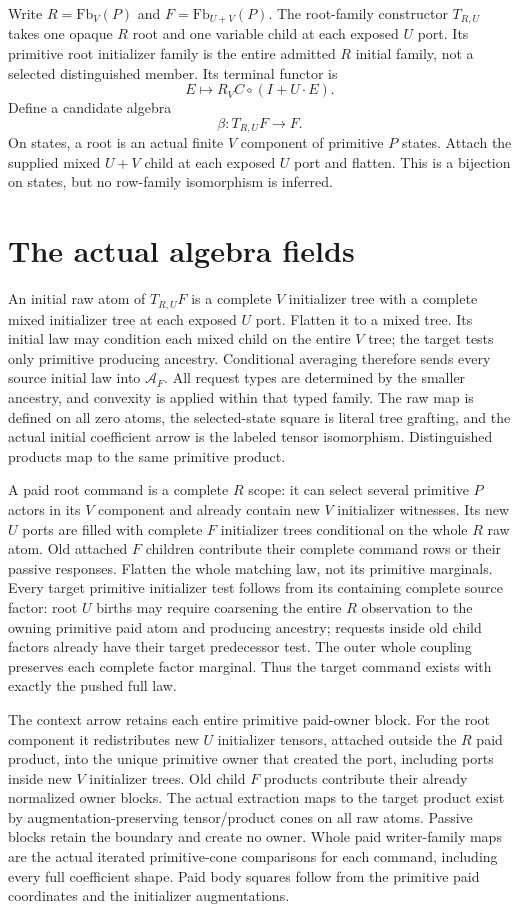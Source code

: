 \documentclass[11pt]{article}\usepackage{amsmath,amssymb,amsthm,geometry}\geometry{margin=1in}\newtheorem{lemma}{Lemma}\newtheorem{theorem}[lemma]{Theorem}
\begin{document}
Write $R=\mathrm{Fb}_V(P)$ and $F=\mathrm{Fb}_{U+V}(P)$. The root-family constructor $T_{R,U}$ takes one opaque $R$ root and one variable child at each exposed $U$ port. Its primitive root initializer family is the entire admitted $R$ initial family, not a selected distinguished member. Its terminal functor is
\[
             E\longmapsto R_VC\circ(I+U\cdot E).
\]
Define a candidate algebra
\[
                        \beta:T_{R,U}F\longrightarrow F.       \tag{1}
\]
On states, a root is an actual finite $V$ component of primitive $P$ states. Attach the supplied mixed $U+V$ child at each exposed $U$ port and flatten. This is a bijection on states, but no row-family isomorphism is inferred.

\section{The actual algebra fields}
An initial raw atom of $T_{R,U}F$ is a complete $V$ initializer tree with a complete mixed initializer tree at each exposed $U$ port. Flatten it to a mixed tree. Its initial law may condition each mixed child on the entire $V$ tree; the target tests only primitive producing ancestry. Conditional averaging therefore sends every source initial law into $\mathcal A_F$. All request types are determined by the smaller ancestry, and convexity is applied within that typed family. The raw map is defined on all zero atoms, the selected-state square is literal tree grafting, and the actual initial coefficient arrow is the labeled tensor isomorphism. Distinguished products map to the same primitive product.

A paid root command is a complete $R$ scope: it can select several primitive $P$ actors in its $V$ component and already contain new $V$ initializer witnesses. Its new $U$ ports are filled with complete $F$ initializer trees conditional on the whole $R$ raw atom. Old attached $F$ children contribute their complete command rows or their passive responses. Flatten the whole matching law, not its primitive marginals. Every target primitive initializer test follows from its containing complete source factor: root $U$ births may require coarsening the entire $R$ observation to the owning primitive paid atom and producing ancestry; requests inside old child factors already have their target predecessor test. The outer whole coupling preserves each complete factor marginal. Thus the target command exists with exactly the pushed full law.

The context arrow retains each entire primitive paid-owner block. For the root component it redistributes new $U$ initializer tensors, attached outside the $R$ paid product, into the unique primitive owner that created the port, including ports inside new $V$ initializer trees. Old child $F$ products contribute their already normalized owner blocks. The actual extraction maps to the target product exist by augmentation-preserving tensor/product cones on all raw atoms. Passive blocks retain the boundary and create no owner. Whole paid writer-family maps are the actual iterated primitive-cone comparisons for each command, including every full coefficient shape. Paid body squares follow from the primitive paid coordinates and the initializer augmentations.
\end{document}
